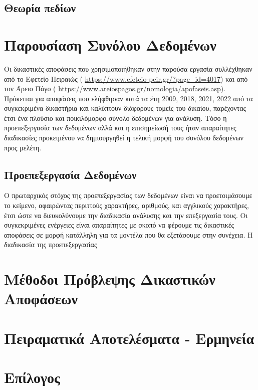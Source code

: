 \documentclass[diploma]{softlab-thesis}
\begin{document}
\section{Θεωρία πεδίων}


\chapter{Παρουσίαση Συνόλου Δεδομένων}

Οι δικαστικές αποφάσεις που χρησιμοποιήθηκαν στην παρούσα εργασία συλλέχθηκαν από το Εφετείο Πειραιώς ( \url{https://www.efeteio-peir.gr/?page_id=4017}) και από τον Άρειο Πάγο ( \url{https://www.areiospagos.gr/nomologia/apofaseis.asp}). Πρόκειται για αποφάσεις που ελήφθησαν κατά τα έτη 2009, 2018, 2021, 2022 από τα συγκεκριμένα δικαστήρια και καλύπτουν διάφορους τομείς του δικαίου, παρέχοντας έτσι ένα πλούσιο και ποικιλόμορφο σύνολο δεδομένων για ανάλυση. Τόσο η προεπεξεργασία των δεδομένων αλλά και η επισημείωσή τους ήταν απαραίτητες διαδικασίες προκειμένου να δημιουργηθεί η τελική μορφή του συνόλου δεδομένων προς μελέτη. 

\section{Προεπεξεργασία Δεδομένων}

Ο πρωταρχικός στόχος της προεπεξεργασίας των δεδομένων είναι να προετοιμάσουμε το κείμενο, αφαιρώντας περιττούς χαρακτήρες, αριθμούς, και αγγλικούς χαρακτήρες, έτσι ώστε να διευκολύνουμε την διαδικασία ανάλυσης και την επεξεργασία τους.
Οι συγκεκριμένες ενέργειες είναι απαραίτητες με σκοπό να φέρουμε τις δικαστικές αποφάσεις σε μορφή κατάλληλη για τα μοντέλα που θα εξετάσουμε στην συνέχεια. Η διαδικασία της προεπεξεργασίας 




\chapter{Μέθοδοι Πρόβλεψης  Δικαστικών Αποφάσεων}

\chapter{Πειραματικά Αποτελέσματα - Ερμηνεία}

\chapter{Επίλογος}
\end{document}
